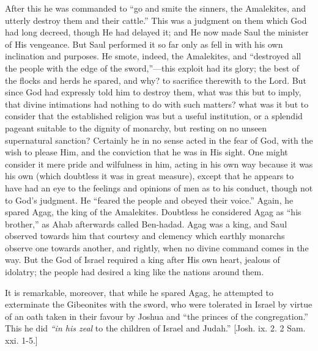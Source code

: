 After this he was commanded to ``go and smite the sinners, the
Amalekites, and utterly destroy them and their cattle.'' This was
a judgment on them which God had long decreed, though He had delayed
it; and He now made Saul the minister of His vengeance. But Saul
performed it so far only as fell in with his own inclination and
purposes. He smote, indeed, the Amalekites, and ``destroyed all
the people with the edge of the sword,''—this exploit had its
glory; the best of the flocks and herds he spared, and why? to
sacrifice therewith to the Lord. But since God had expressly told him
to destroy them, what was this but to imply, that divine intimations
had nothing to do with such matters? what was it but to consider that
the established religion was but a useful institution, or a splendid
pageant suitable to the dignity of monarchy, but resting on no unseen
supernatural sanction? Certainly he in no sense acted in the fear of
God, with the wish to please Him, and the conviction that he was in
His sight. One might consider it mere pride and wilfulness in him,
acting in his own way because it was his own (which doubtless it was
in great measure), except that he appears to have had an eye to the
feelings and opinions of men as to his conduct, though not to God's
judgment. He ``feared the people and obeyed their voice.''
Again, he spared Agag, the king of the Amalekites. Doubtless he
considered Agag as ``his brother,'' as Ahab afterwards called
Ben-hadad. Agag was a king, and Saul observed towards him that
courtesy and clemency which earthly monarchs observe one towards
another, and rightly, when no divine command comes in the way. But the
God of Israel required a king after His own heart, jealous of
idolatry; the people had desired a king like the nations around them.

It is remarkable, moreover, that while he spared Agag, he attempted
to exterminate the Gibeonites with the sword, who were tolerated in
Israel by virtue of an oath taken in their favour by Joshua and
``the princes of the congregation.'' This he did \emph{``in
his zeal} to the children of Israel and Judah.'' [Josh. ix. 2.
2 Sam. xxi. 1-5.]

